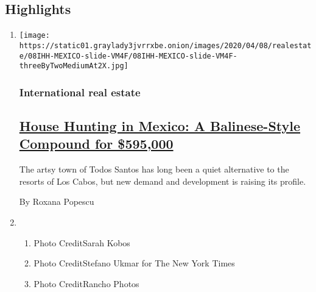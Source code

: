 \hypertarget{highlights}{%
\subsection{Highlights}\label{highlights}}

\begin{enumerate}
\def\labelenumi{\arabic{enumi}.}
\item
  \texttt{[image: https://static01.graylady3jvrrxbe.onion/images/2020/04/08/realestate/08IHH-MEXICO-slide-VM4F/08IHH-MEXICO-slide-VM4F-threeByTwoMediumAt2X.jpg]}

  \hypertarget{international-real-estate}{%
  \subsubsection{International real
  estate}\label{international-real-estate}}

  \hypertarget{house-hunting-in-mexico-a-balinese-style-compound-for-595000}{%
  \subsection{\texorpdfstring{\href{/2020/04/08/realestate/house-hunting-in-mexico-a-balinese-style-compound-for-595000.html}{House
  Hunting in Mexico: A Balinese-Style Compound for
  \$595,000}}{House Hunting in Mexico: A Balinese-Style Compound for \$595,000}}\label{house-hunting-in-mexico-a-balinese-style-compound-for-595000}}

  The artsy town of Todos Santos has long been a quiet alternative to
  the resorts of Los Cabos, but new demand and development is raising
  its profile.

  By Roxana Popescu
\item
  \begin{enumerate}
  \def\labelenumii{\arabic{enumii}.}
  \tightlist
  \item
    Photo CreditSarah Kobos
  \item
    Photo CreditStefano Ukmar for The New York Times
  \item
    Photo CreditRancho Photos
  \end{enumerate}
\end{enumerate}

